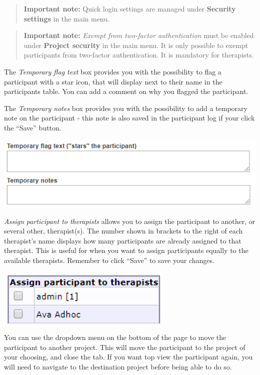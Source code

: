\documentclass[]{book}
\begin{document}
\begin{quote}
\textbf{Important note:} Quick login settings are managed under \textbf{Security settings} in the main menu.
\end{quote}

\begin{quote}
\textbf{Important note:} \emph{Exempt from two-factor authentication} must be enabled under \textbf{Project security} in the main menu. It is only possible to exempt participants from two-factor authentication. It is mandatory for therapists.
\end{quote}

The \emph{Temporary flag text} box provides you with the possibility to flag a participant with a star icon, that will display next to their name in the participants table. You can add a comment on why you flagged the participant.

The \emph{Temporary notes} box provides you with the possibility to add a temporary note on the participant - this note is also saved in the participant log if your click the ``Save'' button.

\includegraphics{images/new-images/participantTempFlagNote.png}

\emph{Assign participant to therapists} allows you to assign the participant to another, or several other, therapist(s). The number shown in brackets to the right of each therapist's name displays how many participants are already assigned to that therapist. This is useful for when you want to assign participants equally to the available therapists.
Remember to click ``Save'' to save your changes.

\includegraphics{images/new-images/participantTherapists.png}

You can use the dropdown menu on the bottom of the page to move the participant to another project. This will move the participant to the project of your choosing, and close the tab. If you want top view the participant again, you will need to navigate to the destination project before being able to do so.
\end{document}
